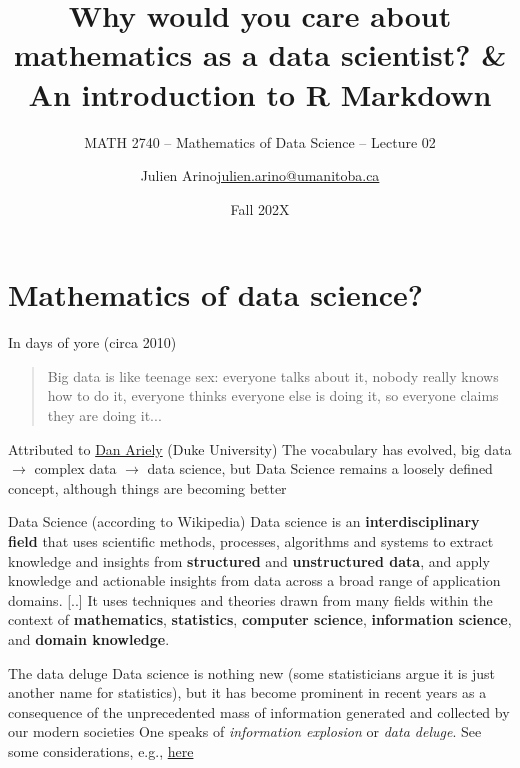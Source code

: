 \documentclass[aspectratio=169]{beamer}\usepackage[]{graphicx}\usepackage[]{xcolor}
\subtitle{MATH 2740 -- Mathematics of Data Science -- Lecture 02}
\author{\texorpdfstring{Julien Arino\newline\url{julien.arino@umanitoba.ca}}{Julien Arino}}
\institute{Department of Mathematics @ University of Manitoba}
\date{Fall 202X}
\title{Why would you care about mathematics as a data scientist? \& An introduction to R Markdown}
\begin{document}


\section{Mathematics of data science?}

\begin{frame}{In days of yore (circa 2010)}
\begin{quote}
Big data is like teenage sex: everyone talks about it, nobody really knows how to do it, everyone thinks everyone else is doing it, so everyone claims they are doing it...
\end{quote}

Attributed to \href{https://twitter.com/danariely/status/287952257926971392?lang=en}{Dan Ariely} (Duke University)
\vfill
The vocabulary has evolved, big data $\to$ complex data $\to$ data science, but Data Science remains a loosely defined concept, although things are becoming better
\end{frame}

\begin{frame}{Data Science (according to Wikipedia)}
Data science is an \textbf{interdisciplinary field} that uses scientific methods, processes, algorithms and systems to extract knowledge and insights from \textbf{structured} and \textbf{unstructured data}, and apply knowledge and actionable insights from data across a broad range of application domains.
\vfill
[..] It uses techniques and theories drawn from many fields within the context of \textbf{mathematics}, \textbf{statistics}, \textbf{computer science}, \textbf{information science}, and \textbf{domain knowledge}.
\end{frame}

\begin{frame}{The data deluge}
\bbullet Data science is nothing new (some statisticians argue it is just another name for statistics), but it has become prominent in recent years as a consequence of the unprecedented mass of information generated and collected by our modern societies
\vfill
\bbullet One speaks of \textit{information explosion} or \textit{data deluge}. See some considerations, e.g., \href{https://bernardmarr.com/how-much-data-is-there-in-the-world/}{here}
\end{frame}
\end{document}
